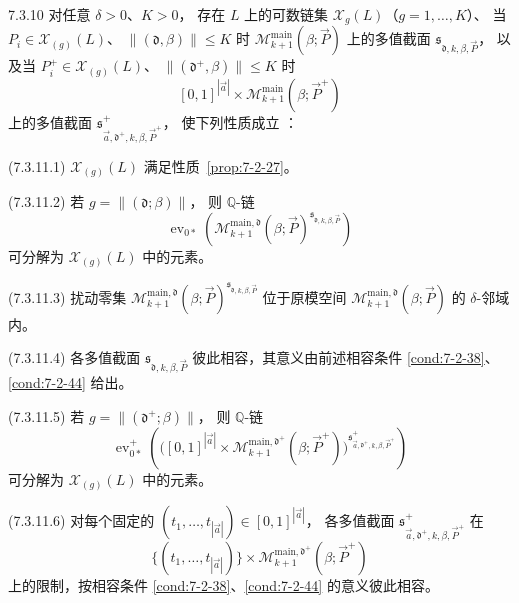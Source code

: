 \begin{proposition}{7.3.10}\label{prop:7-3-10}
对任意 $\delta>0$、$K>0$，
存在 $L$ 上的可数链集
$\mathcal X_g(L)$（$g=1,\ldots,K$）、
当 $P_i\in\mathcal X_{(g)}(L)$、
$\|(\mathfrak d,\beta)\|\le K$ 时
$\mathcal M^{\mathrm{main}}_{k+1}(\beta;\vec P)$
上的多值截面
$\mathfrak s_{\mathfrak d,k,\beta,\vec P}$，
以及当 $P_i^+\in\mathcal X_{(g)}(L)$、
$\|(\mathfrak d^+,\beta)\|\le K$ 时
\[
[0,1]^{|\vec a|}\times
\mathcal M^{\mathrm{main}}_{k+1}(\beta;\vec P^+)
\]
上的多值截面
$\mathfrak s^+_{\vec a,\mathfrak d^+,k,\beta,\vec P^+}$，
使下列性质成立
：

\par\noindent\textup{(7.3.11.1)}\quad
$\mathcal X_{(g)}(L)$ 满足性质~\ref{prop:7-2-27}。

\par\noindent\textup{(7.3.11.2)}\quad
若 $g=\|(\mathfrak d;\beta)\|$，
则 $\mathbb Q$-链
\[
\operatorname{ev}_{0*}\left(
\mathcal M^{\mathrm{main},\mathfrak d}_{k+1}
(\beta;\vec P)
^{\mathfrak s_{\mathfrak d,k,\beta,\vec P}}
\right)
\]
可分解为 $\mathcal X_{(g)}(L)$ 中的元素。

\par\noindent\textup{(7.3.11.3)}\quad
扰动零集
$\mathcal M^{\mathrm{main},\mathfrak d}_{k+1}
(\beta;\vec P)
^{\mathfrak s_{\mathfrak d,k,\beta,\vec P}}$
位于原模空间
$\mathcal M^{\mathrm{main},\mathfrak d}_{k+1}
(\beta;\vec P)$ 的 $\delta$-邻域内。

\par\noindent\textup{(7.3.11.4)}\quad
各多值截面
$\mathfrak s_{\mathfrak d,k,\beta,\vec P}$
彼此相容，其意义由前述相容条件
\ref{cond:7-2-38}、\ref{cond:7-2-44} 给出。

\par\noindent\textup{(7.3.11.5)}\quad
若 $g=\|(\mathfrak d^+;\beta)\|$，
则 $\mathbb Q$-链
\[
\operatorname{ev}_{0*}^+\left(
\bigl([0,1]^{|\vec a|}\times
\mathcal M^{\mathrm{main},\mathfrak d^+}_{k+1}
(\beta;\vec P^+)\bigr)
^{\mathfrak s^+_{\vec a,\mathfrak d^+,k,\beta,\vec P^+}}
\right)
\]
可分解为 $\mathcal X_{(g)}(L)$ 中的元素。

\par\noindent\textup{(7.3.11.6)}\quad
对每个固定的
$(t_1,\ldots,t_{|\vec a|})\in[0,1]^{|\vec a|}$，
各多值截面
$\mathfrak s^+_{\vec a,\mathfrak d^+,k,\beta,\vec P^+}$
在
\[
\{(t_1,\ldots,t_{|\vec a|})\}\times
\mathcal M^{\mathrm{main},\mathfrak d^+}_{k+1}
(\beta;\vec P^+)
\]
上的限制，按相容条件
\ref{cond:7-2-38}、\ref{cond:7-2-44}
的意义彼此相容。


\end{proposition}
